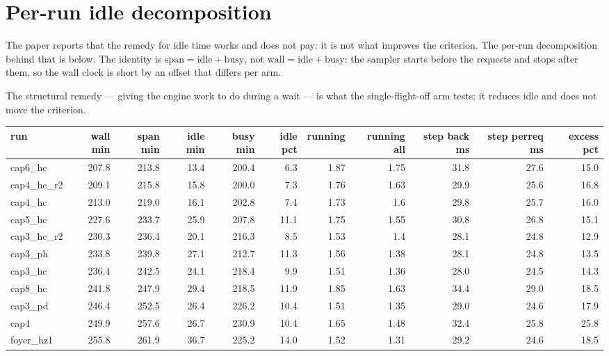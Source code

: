 \documentclass[10pt]{article}
\begin{document}
\section{Per-run idle decomposition}

The paper reports that the remedy for idle time works and does not pay: it is
not what improves the criterion. The per-run decomposition behind that is below.
The identity is $\mathrm{span} = \mathrm{idle} + \mathrm{busy}$, not
$\mathrm{wall} = \mathrm{idle} + \mathrm{busy}$: the sampler starts before the
requests and stops after them, so the wall clock is short by an offset that
differs per arm.

The structural remedy --- giving the engine work to do during a wait --- is what
the single-flight-off arm tests; it reduces idle and does not move the criterion.
\begin{landscape}\begin{center}\footnotesize\setlength{\tabcolsep}{3pt}
\begin{tabular}{lrrrrrrrrrr}
\toprule
run & wall min & span min & idle min & busy min & idle pct & running & running all & step back ms & step perreq ms & excess pct \\
\midrule
cap6\_hc & 207.8 & 213.8 & 13.4 & 200.4 & 6.3 & 1.87 & 1.75 & 31.8 & 27.6 & 15.0 \\
cap4\_hc\_r2 & 209.1 & 215.8 & 15.8 & 200.0 & 7.3 & 1.76 & 1.63 & 29.9 & 25.6 & 16.8 \\
cap4\_hc & 213.0 & 219.0 & 16.1 & 202.8 & 7.4 & 1.73 & 1.6 & 29.8 & 25.7 & 16.0 \\
cap5\_hc & 227.6 & 233.7 & 25.9 & 207.8 & 11.1 & 1.75 & 1.55 & 30.8 & 26.8 & 15.1 \\
cap3\_hc\_r2 & 230.3 & 236.4 & 20.1 & 216.3 & 8.5 & 1.53 & 1.4 & 28.1 & 24.8 & 12.9 \\
cap3\_ph & 233.8 & 239.8 & 27.1 & 212.7 & 11.3 & 1.56 & 1.38 & 28.1 & 24.8 & 13.5 \\
cap3\_hc & 236.4 & 242.5 & 24.1 & 218.4 & 9.9 & 1.51 & 1.36 & 28.0 & 24.5 & 14.3 \\
cap8\_hc & 241.8 & 247.9 & 29.4 & 218.5 & 11.9 & 1.85 & 1.63 & 34.4 & 29.0 & 18.5 \\
cap3\_pd & 246.4 & 252.5 & 26.4 & 226.2 & 10.4 & 1.51 & 1.35 & 29.0 & 24.6 & 17.9 \\
cap4 & 249.9 & 257.6 & 26.7 & 230.9 & 10.4 & 1.65 & 1.48 & 32.4 & 25.8 & 25.8 \\
foyer\_hz1 & 255.8 & 261.9 & 36.7 & 225.2 & 14.0 & 1.52 & 1.31 & 29.2 & 24.6 & 18.5 \\

\end{tabular}
\end{center}
\end{landscape}
\end{document}
